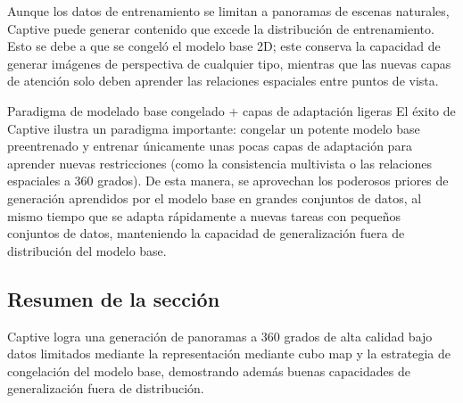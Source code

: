 Aunque los datos de entrenamiento se limitan a panoramas de escenas naturales, Captive puede generar contenido que excede la distribución de entrenamiento. Esto se debe a que se congeló el modelo base 2D; este conserva la capacidad de generar imágenes de perspectiva de cualquier tipo, mientras que las nuevas capas de atención solo deben aprender las relaciones espaciales entre puntos de vista.

\begin{knowledgebox}{Paradigma de modelado base congelado + capas de adaptación ligeras}
El éxito de Captive ilustra un paradigma importante: congelar un potente modelo base preentrenado y entrenar únicamente unas pocas capas de adaptación para aprender nuevas restricciones (como la consistencia multivista o las relaciones espaciales a 360 grados). De esta manera, se aprovechan los poderosos priores de generación aprendidos por el modelo base en grandes conjuntos de datos, al mismo tiempo que se adapta rápidamente a nuevas tareas con pequeños conjuntos de datos, manteniendo la capacidad de generalización fuera de distribución del modelo base.
\end{knowledgebox}

\subsection{Resumen de la sección}

Captive logra una generación de panoramas a 360 grados de alta calidad bajo datos limitados mediante la representación mediante cubo map y la estrategia de congelación del modelo base, demostrando además buenas capacidades de generalización fuera de distribución.
